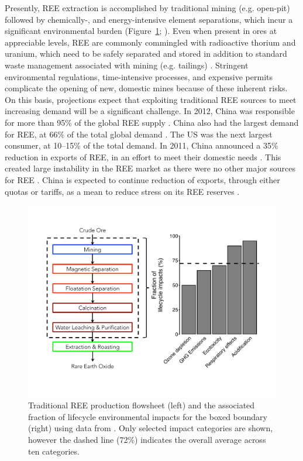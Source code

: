 Presently, REE extraction is accomplished by traditional mining (e.g. open-pit) followed by chemically-, and energy-intensive element separations, which incur a significant environmental burden (Figure~\ref{fig:Zaimes-LCA}; \citep{Zaimes_SCE_2015}).
Even when present in ores at appreciable levels, REE are commonly commingled with radioactive thorium and uranium, which need to be safely separated and stored in addition to standard waste management associated with mining (e.g. tailings) \citep{Gupta_IMR_1992, Sprecher_EST_2014}.
Stringent environmental regulations, time-intensive processes, and expensive permits complicate the opening of new, domestic mines because of these inherent risks.
On this basis, projections expect that exploiting traditional REE sources to meet increasing demand will be a significant challenge.
In 2012, China was responsible for more than 95\% of the global REE supply \citep{USGS_commsumm}.
China also had the largest demand for REE, at 66\% of the total global demand \citep{USGS_commsumm}.
The US was the next largest consumer, at 10--15\% of the total demand.
In 2011, China announced a 35\% reduction in exports of REE, in an effort to meet their domestic needs \citep{USGS_minyb_2012}.
This created large instability in the REE market as there were no other major sources for REE \citep{Alonso_EST_2012, Chakmour_Elem_2012, Hatch_Elem_2012}.
China is expected to continue reduction of exports, through either quotas or tariffs, as a mean to reduce stress on its REE reserves \citep{FrostSullivan_REEmarket, USGS_commsumm}.

\begin{figure}[htbp]
\begin{center}
\includegraphics[width = \textwidth]{proposal_figures/Zaimes-LCA-schematic.pdf}
\caption{Traditional REE production flowsheet (left) and the associated fraction of lifecycle environmental impacts for the boxed boundary (right) using data from \citet{Zaimes_SCE_2015}.
Only selected impact categories are shown, however the dashed line (72\%) indicates the overall average across ten categories.}\label{fig:Zaimes-LCA}
\end{center}
\end{figure}

